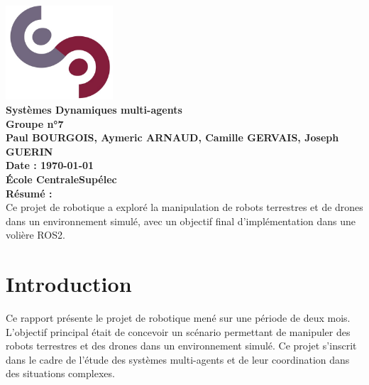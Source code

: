 \documentclass[a4paper,12pt]{article}
\renewcommand{\cftsecafterpnum}{\vspace{1em}} %
\renewcommand{\cftsubsecafterpnum}{\vspace{1em}} %
\begin{document}
\begin{titlepage}
\begin{center}
    \includegraphics[width=0.3\textwidth]{logo_cs.jpg}\\[1cm] %
    {\Huge\textbf{Systèmes Dynamiques multi-agents}}\\[0.5cm]
    \textbf{Groupe n°7\\Paul BOURGOIS, Aymeric ARNAUD, Camille GERVAIS, Joseph GUERIN}\\[1cm]
    \textbf{Date : \today}\\[1cm]
    \textbf{École CentraleSupélec}\\[1cm]
    \vfill
    \textbf{Résumé :}\\[0.5cm]
    Ce projet de robotique a exploré la manipulation de robots terrestres et de drones dans un environnement simulé, avec un objectif final d'implémentation dans une volière ROS2.\\[1cm]
    \vfill
\end{center}
\end{titlepage}

\renewcommand{\cftsecfont}{\color{militarygreen}\bfseries}
\renewcommand{\cftsubsecfont}{\color{khaki}\bfseries}
\renewcommand{\cftsecafterpnum}{\vspace{-0.5em}} %
\renewcommand{\cftsubsecafterpnum}{\vspace{-0.5em}} %

\tableofcontents

\newpage

\section*{Introduction}
Ce rapport présente le projet de robotique mené sur une période de deux mois. L'objectif principal était de concevoir un scénario permettant de manipuler des robots terrestres et des drones dans un environnement simulé. Ce projet s'inscrit dans le cadre de l'étude des systèmes multi-agents et de leur coordination dans des situations complexes.
\end{document}
